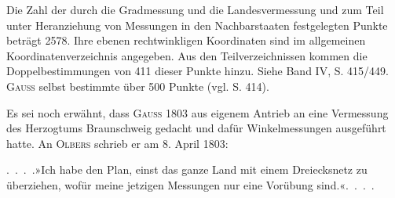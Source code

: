 \par\noindent\hspace*{\parindent}Die Zahl der durch die Gradmessung und die Landesvermessung und zum Teil unter Heranziehung von Messungen in den Nachbarstaaten festgelegten Punkte beträgt 2578. Ihre ebenen rechtwinkligen Koordinaten sind im allgemeinen Koordinatenverzeichnis angegeben. Aus den Teilverzeichnissen kommen die Doppelbestimmungen von 411 dieser Punkte hinzu. Siehe Band IV, S. 415/449. \textsc{Gauss} selbst bestimmte über 500 Punkte (vgl. S. 414).
\par\bigskip
\par\noindent\hspace*{\parindent}Es sei noch erwähnt, dass \textsc{Gauss} 1803 aus eigenem Antrieb an eine Vermessung des Herzogtums Braunschweig gedacht und dafür Winkelmessungen ausgeführt hatte. An \textsc{Olbers} schrieb er am 8. April 1803:

\par\noindent\hspace*{\parindent}.\ .\ .\ .\enspace »Ich habe den Plan, einst das ganze Land mit einem Dreiecksnetz zu überziehen, wofür meine jetzigen Messungen nur eine Vorübung sind.«\enspace .\ .\ .\ .

